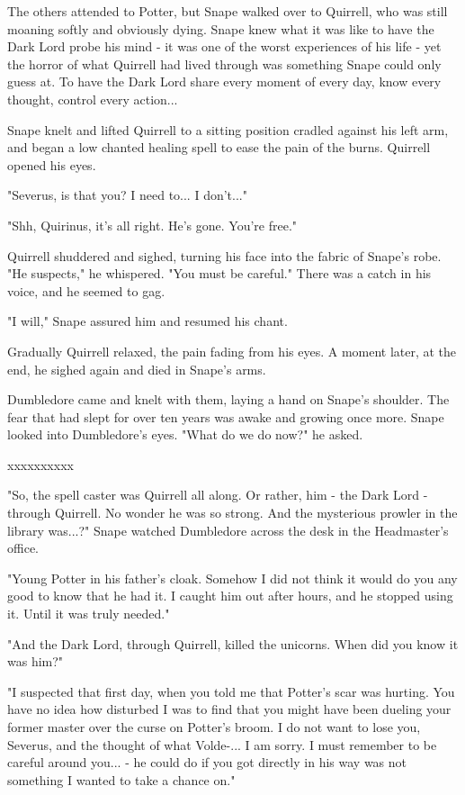 \documentclass[a4paper,11pt]{article}
\begin{document}
The others attended to Potter, but Snape walked over to Quirrell, who was still moaning softly and obviously dying. Snape knew what it was like to have the Dark Lord probe his mind - it was one of the worst experiences of his life - yet the horror of what Quirrell had lived through was something Snape could only guess at. To have the Dark Lord share every moment of every day, know every thought, control every action...

Snape knelt and lifted Quirrell to a sitting position cradled against his left arm, and began a low chanted healing spell to ease the pain of the burns. Quirrell opened his eyes.

"Severus, is that you? I need to... I don't..."

"Shh, Quirinus, it's all right. He's gone. You're free."

Quirrell shuddered and sighed, turning his face into the fabric of Snape's robe. "He suspects," he whispered. "You must be careful." There was a catch in his voice, and he seemed to gag.

"I will," Snape assured him and resumed his chant.

Gradually Quirrell relaxed, the pain fading from his eyes. A moment later, at the end, he sighed again and died in Snape's arms.

Dumbledore came and knelt with them, laying a hand on Snape's shoulder. The fear that had slept for over ten years was awake and growing once more. Snape looked into Dumbledore's eyes. "What do we do now?" he asked.

xxxxxxxxxx

"So, the spell caster was Quirrell all along. Or rather, him - the Dark Lord - through Quirrell. No wonder he was so strong. And the mysterious prowler in the library was...?" Snape watched Dumbledore across the desk in the Headmaster's office.

"Young Potter in his father's cloak. Somehow I did not think it would do you any good to know that he had it. I caught him out after hours, and he stopped using it. Until it was truly needed."

"And the Dark Lord, through Quirrell, killed the unicorns. When did you know it was him?"

"I suspected that first day, when you told me that Potter's scar was hurting. You have no idea how disturbed I was to find that you might have been dueling your former master over the curse on Potter's broom. I do not want to lose you, Severus, and the thought of what Volde-... I am sorry. I must remember to be careful around you... - he could do if you got directly in his way was not something I wanted to take a chance on."
\end{document}
